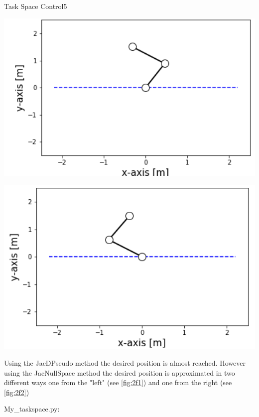 \begin{questions}
\begin{question}[bonus]{Task Space Control}{5}
\begin{answer}
			\noindent\begin{minipage}{.5\textwidth}
				\centering
				\includegraphics[width=1\textwidth]{img/2f0pi.png} 
				\label{fig:2f1}            
			\end{minipage}%
			\begin{minipage}{.5\textwidth}
				\centering
				\includegraphics[width=1\textwidth]{img/2f0-pi.png} 
				\label{fig:2f2}                 
			\end{minipage}

Using the JacDPseudo method the desired position is almost reached. However using the JacNullSpace method the desired position is approximated in two different ways one from the "left" (see \ref{fig:2f1}) and one from the right (see \ref{fig:2f2})

My\_taskspace.py:\\
	
	
	\end{answer}
		
	\end{question}
	
\end{questions}

